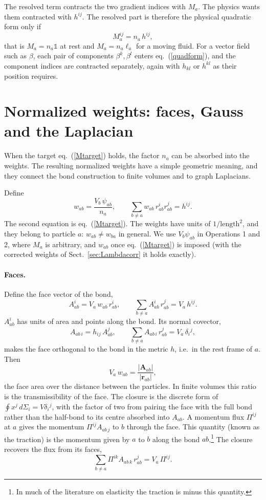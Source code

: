 \documentclass[11pt,aps,preprint,nofootinbib,superscriptaddress,tightenlines]{revtex4-2}
\def\st{\begin{equation}}
\def\stp{\end{equation}}
\def\Eq#1{eq.~(\ref{#1})}
\def\Sect#1{Sect.~\ref{#1}}
\newcommand{\one}{\mathds{1}}
\let\oldparagraph\paragraph
\renewcommand{\paragraph}{\par\medskip\oldparagraph}
\begin{document}
The resolved term contracts the two gradient indices with $M_a$.  The physics
wants them contracted with $h^{ij}$.  The resolved part is therefore the
physical quadratic form only if
\st
M_a^{ij}=n_a\,h^{ij} ,
\label{Mtarget}
\stp
that is $M_a=n_a\one$ at rest and $M_a=n_a\ell_a$ for a moving fluid.  For a
vector field such as $\beta$, each pair of components $\beta^k,\beta^l$ enters
\Eq{quadform}, and the component indices are contracted separately, again with
$h_{kl}$ or $h^{kl}$ as their position requires.

\section{Normalized weights: faces, Gauss and the Laplacian}
\label{sec:weights}

When the target \Eq{Mtarget} holds, the factor $n_a$ can be absorbed into the
weights.  The resulting normalized weights have a simple geometric meaning, and
they connect the bond construction to finite volumes and to graph Laplacians.

Define
\st
w_{ab}=\frac{V_b\,\psi_{ab}}{n_a},\qquad
\sum_{b\neq a}w_{ab}\,r^i_{ab}r^j_{ab}=h^{ij} .
\label{wdef}
\stp
The second equation is \Eq{Mtarget}.  The weights have units of
$1/\text{length}^2$, and they belong to particle $a$: $w_{ab}\neq w_{ba}$ in
general.  We use $V_b\psi_{ab}$ in Operations 1 and 2, where $M_a$ is
arbitrary, and $w_{ab}$ once \Eq{Mtarget} is imposed (with the corrected weights
of \Sect{sec:Lambdacorr} it holds exactly).

\paragraph{Faces.}  Define the face vector of the bond,
\st
A^i_{ab}=V_a\,w_{ab}\,r^i_{ab},\qquad
\sum_{b\neq a}A^i_{ab}\,r^j_{ab}=V_a\,h^{ij} .
\label{Adef}
\stp
$A^i_{ab}$ has units of area and points along the bond.  Its normal covector,
\st
A_{ab\,i}=h_{ij}\,A^j_{ab},\qquad \sum_{b\neq a}A_{ab\,i}\,r^j_{ab}=V_a\,\delta_i{}^j ,
\stp
makes the face orthogonal to the bond in the metric $h$, i.e.\ in the rest frame
of $a$.  Then
\st
V_a\,w_{ab}=\frac{|\bm A_{ab}|}{|\bm r_{ab}|},
\stp
the face area over the distance between the particles.  In finite volumes this
ratio is the transmissibility of the face.  The closure is the discrete form of
$\oint x^j\,d\Sigma_i=V\delta_i{}^j$, with the factor of two from pairing the face
with the full bond rather than the half-bond to its centre absorbed into
$A_{ab}$.  A momentum flux $\Pi^{ij}$ at $a$ gives the momentum $\Pi^{ij}A_{ab\,j}$
to $b$ through the face.  This quantity (known as the traction) is the momentum
given by $a$ to $b$ along the bond $ab$.\footnote{In much of the literature on
elasticity the traction is minus this quantity.}  The closure recovers the flux from its faces,
\st
\sum_{b\neq a}\Pi^{ik}A_{ab\,k}\,r^j_{ab}=V_a\,\Pi^{ij} .
\stp
\end{document}
